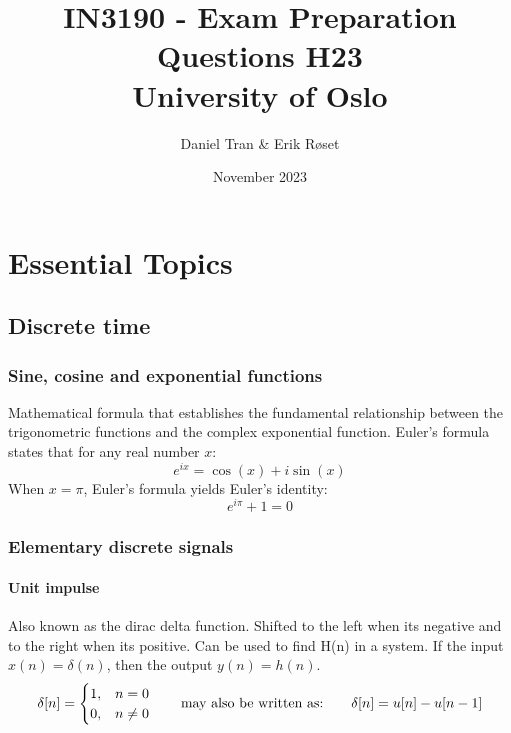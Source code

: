 \documentclass{article}
\begin{document}
\title{IN3190 - Exam Preparation Questions H23\\
{\Large University of Oslo}}
\author{Daniel Tran \& Erik Røset}
\date{November 2023}
\maketitle
\hypersetup{linkcolor=black}
\tableofcontents
\clearpage

\section{Essential Topics}
\subsection{Discrete time}
\subsubsection{Sine, cosine and exponential functions}

    Mathematical formula that establishes the fundamental relationship between the trigonometric functions and the complex exponential function. \newline
    Euler's formula states that for any real number $x$:
    \begin{equation}
        e^{ix} = \cos(x) + i\sin(x)
    \end{equation}
    When $x = \pi$, Euler's formula yields Euler's identity:
    \begin{equation}
        e^{i\pi} + 1 = 0
    \end{equation}
\subsubsection{Elementary discrete signals}
\paragraph{Unit impulse} %
Also known as the dirac delta function. Shifted to the left when its negative and to the right when its positive. Can be used to find H(n) in a system. If the input $x(n) = \delta(n)$, then the output $y(n) = h(n)$.
\begin{equation}
    \delta[n] = \begin{cases}
        1, & n = 0 \\
        0, & n \neq 0
    \end{cases}
    \hspace*{20pt}\text{may also be written as:}
    \hspace*{20pt} \delta[n] = u[n] - u[n-1]
\end{equation}
\end{document}
